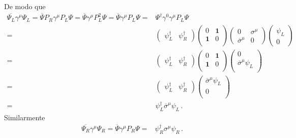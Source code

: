 \begin{frame}
De modo que
\begin{align}
  \overline{\Psi_L}\gamma^{\mu}\Psi_L=
    \overline{\Psi}P_R\gamma^{\mu}P_{L}\Psi=
  \overline{\Psi}\gamma^{\mu}P_L^2\Psi=
  \overline{\Psi}\gamma^{\mu}P_{L}\Psi=&\Psi^{\dagger}\gamma^0\gamma^{\mu}P_L \Psi \nonumber\\
=&  \begin{pmatrix}
     \psi_L^{\dagger} & \psi_R^{\dagger}  
  \end{pmatrix}
  \begin{pmatrix}
    0 & \mathbf{1} \\
    \mathbf{1} & 0 \\
  \end{pmatrix}
  \begin{pmatrix}
   0 & \sigma^{\mu}\\
   \overline{\sigma}^{\mu} & 0     
  \end{pmatrix}
  \begin{pmatrix}
   \psi_L\\
     0      
  \end{pmatrix}\nonumber\\
=&  \begin{pmatrix}
     \psi_L^{\dagger} & \psi_R^{\dagger}  
  \end{pmatrix}
  \begin{pmatrix}
    0 & \mathbf{1} \\
    \mathbf{1} & 0 \\
  \end{pmatrix}
  \begin{pmatrix}
     0\\
   \overline{\sigma}^{\mu}\psi_L\\
  \end{pmatrix}\nonumber\\
=&  \begin{pmatrix}
     \psi_L^{\dagger} & \psi_R^{\dagger}  
  \end{pmatrix}
  \begin{pmatrix}
   \overline{\sigma}^{\mu}\psi_L\\
     0\\
  \end{pmatrix}\nonumber\\
=&   \psi_L^{\dagger} \overline{\sigma}^{\mu}\psi_L\,.
\end{align}
Similarmente
\begin{align}
\overline{\Psi_R}\gamma^{\mu}\Psi_R=\overline{\Psi}\gamma^{\mu}P_{R}\Psi=&   \psi_R^{\dagger} {\sigma}^{\mu}\psi_R\,.
\end{align}




\end{frame}
